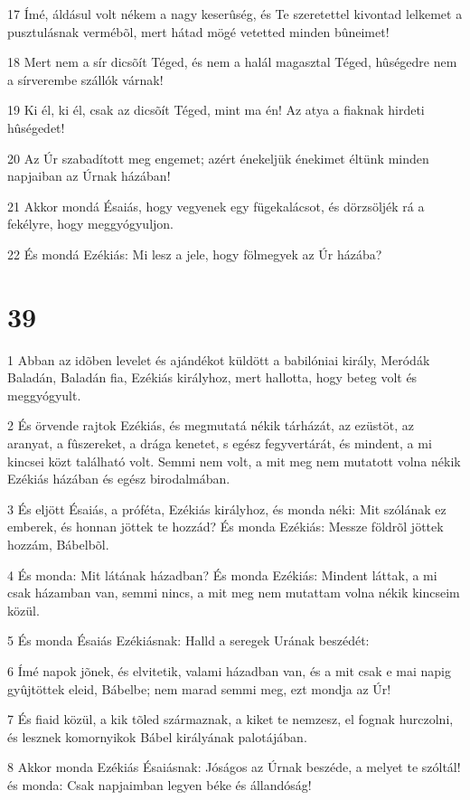\par 17 Ímé, áldásul volt nékem a nagy keserûség, és Te szeretettel kivontad lelkemet a pusztulásnak vermébõl, mert hátad mögé vetetted minden bûneimet!
\par 18 Mert nem a sír dicsõít Téged, és nem a halál magasztal Téged, hûségedre nem a sírverembe szállók várnak!
\par 19 Ki él, ki él, csak az dicsõít Téged, mint ma én! Az atya a fiaknak hirdeti hûségedet!
\par 20 Az Úr szabadított meg engemet; azért énekeljük énekimet éltünk minden napjaiban az Úrnak házában!
\par 21 Akkor mondá Ésaiás, hogy vegyenek egy fügekalácsot, és dörzsöljék rá a fekélyre, hogy meggyógyuljon.
\par 22 És mondá Ezékiás: Mi lesz a jele, hogy fölmegyek az Úr házába?

\chapter{39}

\par 1 Abban az idõben levelet és ajándékot küldött a babilóniai király, Meródák Baladán, Baladán fia, Ezékiás királyhoz, mert hallotta, hogy beteg volt és meggyógyult.
\par 2 És örvende rajtok Ezékiás, és megmutatá nékik tárházát, az ezüstöt, az aranyat, a fûszereket, a drága kenetet, s egész fegyvertárát, és mindent, a mi kincsei közt található volt. Semmi nem volt, a mit meg nem mutatott volna nékik Ezékiás házában és egész birodalmában.
\par 3 És eljött Ésaiás, a próféta, Ezékiás királyhoz, és monda néki: Mit szólának ez emberek, és honnan jöttek te hozzád? És monda Ezékiás: Messze földrõl jöttek hozzám, Bábelbõl.
\par 4 És monda: Mit látának házadban? És monda Ezékiás: Mindent láttak, a mi csak házamban van, semmi nincs, a mit meg nem mutattam volna nékik kincseim közül.
\par 5 És monda Ésaiás Ezékiásnak: Halld a seregek Urának beszédét:
\par 6 Ímé napok jõnek, és elvitetik, valami házadban van, és a mit csak e mai napig gyûjtöttek eleid, Bábelbe; nem marad semmi meg, ezt mondja az Úr!
\par 7 És fiaid közül, a kik tõled származnak, a kiket te nemzesz, el fognak hurczolni, és lesznek komornyikok Bábel királyának palotájában.
\par 8 Akkor monda Ezékiás Ésaiásnak: Jóságos az Úrnak beszéde, a melyet te szóltál! és monda: Csak napjaimban legyen béke és állandóság!

